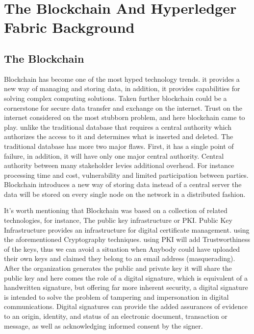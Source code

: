 \chapter{The Blockchain And Hyperledger Fabric Background}


\section{The Blockchain} 


 Blockchain has become one of the most hyped technology trends. it provides a new way of managing and storing data, in addition, it provides capabilities for solving complex computing solutions. Taken further blockchain could be a cornerstone for secure data transfer and exchange on the internet.
Trust on the internet considered on the most stubborn problem, and here blockchain came to play. unlike the traditional database that requires a central authority which authorizes the access to it and determines what is inserted and deleted. The traditional database has more two major flaws. 
First, it has a single point of failure, in addition, it will have only one major central authority. Central authority between many stakeholder levies additional overhead. 
For instance processing time and cost, vulnerability and limited participation between parties.  
Blockchain introduces a new way of storing data instead of a central server the data will be stored on every single node on the network in a distributed fashion. 

It's worth mentioning that Blockchain was based on a collection of related technologies, for instance, The public key infrastructure or PKI.
Public Key Infrastructure provides an infrastructure for digital certificate management. using the
aforementioned Cryptography techniques. using PKI will add Trustworthiness of the keys, thus we
can avoid a situation when Anybody could have uploaded their own keys and claimed they belong
to an email address (masquerading). After the organization generates the public and private key
it will share the public key and here comes the role of a digital signature, which is equivalent of
a handwritten signature, but offering far more inherent security, a digital signature is intended to
solve the problem of tampering and impersonation in digital communications. Digital signatures can
provide the added assurances of evidence to an origin, identity, and status of an electronic document,
transaction or message, as well as acknowledging informed consent by the signer. \\


